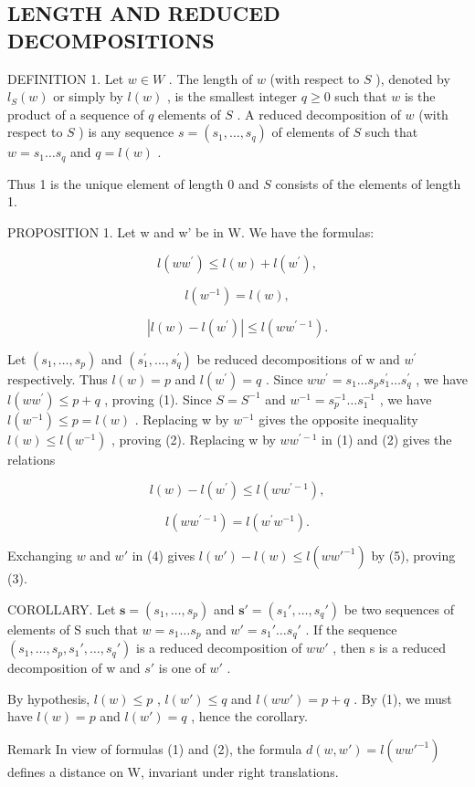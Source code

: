 \subsection{LENGTH AND REDUCED DECOMPOSITIONS}

DEFINITION 1. Let \(w \in W\) . The length of \(w\) (with respect to \(S\) ), denoted by \(l_{S}(w)\) or simply by \(l(w)\) , is the smallest integer \(q \geqslant 0\) such that \(w\) is the product of a sequence of \(q\) elements of \(S\) . A reduced decomposition of \(w\) (with respect to \(S\) ) is any sequence \(s = (s_1, \ldots, s_q)\) of elements of \(S\) such that \(w = s_1 \ldots s_q\) and \(q = l(w)\) .

Thus 1 is the unique element of length 0 and \(S\) consists of the elements of length 1.

PROPOSITION 1. Let w and w' be in W. We have the formulas:

\[
l (w w ^ {\prime}) \leqslant l (w) + l (w ^ {\prime}),\tag{1}
\]

\[
l (w ^ {- 1}) = l (w),\tag{2}
\]

\[
\left| l (w) - l \left(w ^ {\prime}\right) \right| \leqslant l \left(w w ^ {\prime - 1}\right).\tag{3}
\]

Let \((s_{1},\ldots,s_{p})\) and \((s_{1}^{\prime},\ldots,s_{q}^{\prime})\) be reduced decompositions of w and \(w^{\prime}\) respectively. Thus \(l(w)=p\) and \(l(w^{\prime})=q\) . Since \(ww^{\prime}=s_{1}\ldots s_{p}s_{1}^{\prime}\ldots s_{q}^{\prime}\) , we have \(l(ww^{\prime})\leqslant p+q\) , proving (1). Since \(S=S^{-1}\) and \(w^{-1}=s_{p}^{-1}\ldots s_{1}^{-1}\) , we have \(l(w^{-1})\leqslant p=l(w)\) . Replacing w by \(w^{-1}\) gives the opposite inequality \(l(w)\leqslant l(w^{-1})\) , proving (2). Replacing w by \(ww^{\prime-1}\) in (1) and (2) gives the relations

\[
l (w) - l \left(w ^ {\prime}\right) \leqslant l \left(w w ^ {\prime - 1}\right),\tag{4}
\]

\[
l \left(w w ^ {\prime - 1}\right) = l \left(w ^ {\prime} w ^ {- 1}\right).\tag{5}
\]

Exchanging \(w\) and \(w'\) in (4) gives \(l(w') - l(w) \leqslant l(ww'^{-1})\) by (5), proving (3).

COROLLARY. Let \(\mathbf{s} = (s_{1}, \ldots, s_{p})\) and \(\mathbf{s}' = (s_{1}', \ldots, s_{q}')\) be two sequences of elements of S such that \(w = s_{1} \ldots s_{p}\) and \(w' = s_{1}' \ldots s_{q}'\) . If the sequence \((s_{1}, \ldots, s_{p}, s_{1}', \ldots, s_{q}')\) is a reduced decomposition of \(ww'\) , then s is a reduced decomposition of w and \(s'\) is one of \(w'\) .

By hypothesis, \(l(w) \leqslant p\) , \(l(w') \leqslant q\) and \(l(ww') = p + q\) . By (1), we must have \(l(w) = p\) and \(l(w') = q\) , hence the corollary.

Remark In view of formulas (1) and (2), the formula \(d(w, w') = l(ww'^{-1})\) defines a distance on W, invariant under right translations.

